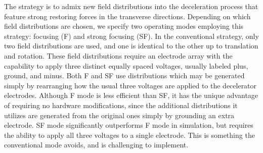 \documentclass[%
 reprint,
 amsmath,amssymb,
 aps,
prl,
]{revtex4-1}
\begin{document}
The strategy is to admix new field distributions into the deceleration process that feature strong restoring forces in the transverse directions.
Depending on which field distributions are chosen, we specify two operating modes employing this strategy: focusing (F) and strong focusing (SF).
In the conventional strategy, only two field distributions are used, and one is identical to the other up to translation and rotation.
These field distributions require an electrode array with the capability to apply three distinct equally spaced voltages, usually labeled plus, ground, and minus.
Both F and SF use distributions which may be generated simply by rearranging how the usual three voltages are applied to the decelerator electrodes.
Although F mode is less efficient than SF, it has the unique advantage of requiring no hardware modifications, since the additional distributions it utilizes are generated from the original ones simply by grounding an extra electrode.
SF mode significantly outperforms F mode in simulation, but requires the ability to apply all three voltages to a single electrode.
This is something the conventional mode avoids, and is challenging to implement.
\end{document}

